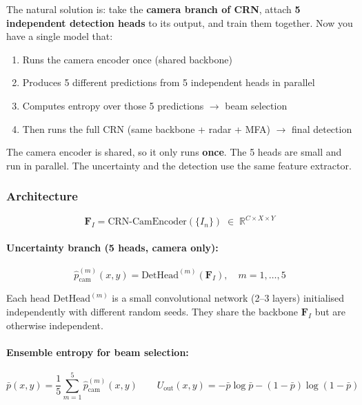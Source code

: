 \documentclass[12pt, a4paper]{article}
\newcommand{\FI}{\mathbf{F}_{I}}
\newcommand{\Uout}{U_{\mathrm{out}}}
\newcommand{\R}{\mathbb{R}}
\theoremstyle{definition}
\begin{document}
\begin{plainbox}
The natural solution is: take the \textbf{camera branch of CRN}, attach
\textbf{5 independent detection heads} to its output, and train them together.
Now you have a single model that:
\begin{enumerate}
  \item Runs the camera encoder once (shared backbone)
  \item Produces 5 different predictions from 5 independent heads in parallel
  \item Computes entropy over those 5 predictions $\to$ beam selection
  \item Then runs the full CRN (same backbone + radar + MFA) $\to$ final detection
\end{enumerate}
The camera encoder is shared, so it only runs \textbf{once}. The 5 heads are small
and run in parallel. The uncertainty and the detection use the same feature extractor.
\end{plainbox}

\subsubsection{Architecture}

\begin{equation}
  \FI = \mathrm{CRN\text{-}CamEncoder}(\{I_n\}) \;\in\; \R^{C\times X\times Y}
\end{equation}

\paragraph{Uncertainty branch (5 heads, camera only):}
\begin{equation}
  \hat{p}^{(m)}_{\mathrm{cam}}(x,y)
  = \mathrm{DetHead}^{(m)}\!\left(\FI\right),
  \quad m = 1,\ldots,5
  \label{eq:cam_ensemble_heads}
\end{equation}

Each head $\mathrm{DetHead}^{(m)}$ is a small convolutional network (2--3 layers)
initialised independently with different random seeds. They share the backbone
$\FI$ but are otherwise independent.

\paragraph{Ensemble entropy for beam selection:}
\begin{equation}
  \bar{p}(x,y) = \frac{1}{5}\sum_{m=1}^{5}\hat{p}^{(m)}_{\mathrm{cam}}(x,y)
  \qquad
  \Uout(x,y) = -\bar{p}\log\bar{p} - (1-\bar{p})\log(1-\bar{p})
  \label{eq:cam_entropy}
\end{equation}
\end{document}

